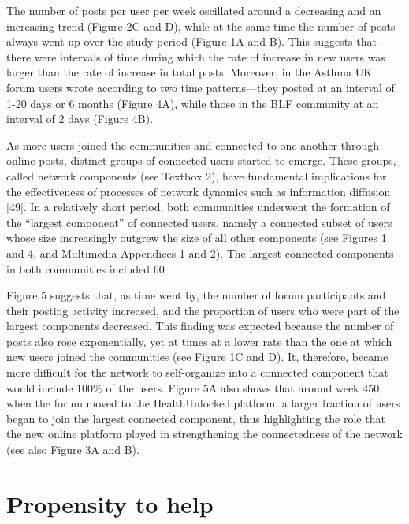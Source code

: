 The number of posts per user per week oscillated around a decreasing and an increasing trend (Figure 2C and D), while at the same time the number of posts always went up over the study period (Figure 1A and B). This suggests that there were intervals of time during which the rate of increase in new users was larger than the rate of increase in total posts. Moreover, in the Asthma UK forum users wrote according to two time patterns—they posted at an interval of 1-20 days or 6 months (Figure 4A), while those in the BLF community at an interval of 2 days (Figure 4B).

As more users joined the communities and connected to one another through online posts, distinct groups of connected users started to emerge. These groups, called network components (see Textbox 2), have fundamental implications for the effectiveness of processes of network dynamics such as information diffusion [49]. In a relatively short period, both communities underwent the formation of the “largest component” of connected users, namely a connected subset of users whose size increasingly outgrew the size of all other components (see Figures 1 and 4, and Multimedia Appendices 1 and 2). The largest connected components in both communities included 60%

Figure 5 suggests that, as time went by, the number of forum participants and their posting activity increased, and the proportion of users who were part of the largest components decreased. This finding was expected because the number of posts also rose exponentially, yet at times at a lower rate than the one at which new users joined the communities (see Figure 1C and D). It, therefore, became more difficult for the network to self-organize into a connected component that would include 100\% of the users. Figure 5A also shows that around week 450, when the forum moved to the HealthUnlocked platform, a larger fraction of users began to join the largest connected component, thus highlighting the role that the new online platform played in strengthening the connectedness of the network (see also Figure 3A and B).

\section{Propensity to help} 


